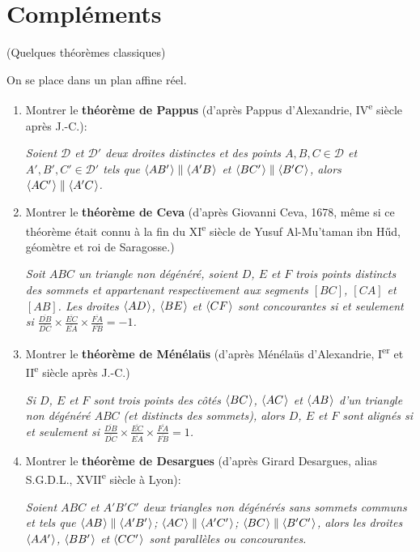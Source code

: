 \documentclass[a4paper,12pt,reqno]{amsart}
\begin{document}
\section{Compléments}

\begin{exo} (Quelques théorèmes classiques)

  On se place dans un plan affine réel.

  \begin{enumerate}
  \item Montrer le \textbf{théorème de Pappus} (d'après Pappus d'Alexandrie, IV\textsuperscript{e} siècle après J.-C.):

  \textit{\og Soient $\mathcal{D}$ et $\mathcal{D}'$ deux droites distinctes et des points $A,B,C\in \mathcal{D}$ et $A',B',C'\in \mathcal{D}'$
  tels que $\langle{AB'}\kern.07em\rangle\parallel\langle{A'B}\kern.07em\rangle$ et $\langle{BC'}\kern.07em\rangle\parallel\langle{B'C}\kern.07em\rangle$, alors $\langle{AC'}\kern.07em\rangle\parallel\langle{A'C}\kern.07em\rangle$.\fg}

  \item Montrer le \textbf{théorème de Ceva} (d'après Giovanni Ceva, 1678, même si ce théorème était connu à la fin du XI\textsuperscript{e} siècle de Yusuf Al-Mu'taman ibn Hűd, géomètre et roi de Saragosse.)

  \textit{\og Soit $ABC$ un triangle non dégénéré, soient $D$, $E$ et $F$ trois points distincts des sommets et appartenant respectivement aux segments $[BC]$, $[CA]$ et $[AB]$. Les droites $\langle{AD}\kern.07em\rangle$, $\langle{BE}\kern.07em\rangle$ et $\langle{CF}\kern.07em\rangle$ sont concourantes si et seulement si $\frac{\overline{DB}}{\overline{DC}}\times\frac{\overline{EC}}{\overline{EA}}\times\frac{\overline{FA}}{\overline{FB}}=-1$.\fg}

  \item Montrer le \textbf{théorème de Ménélaüs} (d'après Ménélaüs d'Alexandrie, I\textsuperscript{er} et II\textsuperscript{e} siècle après J.-C.)

  \textit{\og Si $D$, $E$ et $F$ sont trois points des côtés $\langle{BC}\kern.07em\rangle$, $\langle{AC}\kern.07em\rangle$ et $\langle{AB}\kern.07em\rangle$ d'un triangle non dégénéré $ABC$ (et distincts des sommets), alors $D$, $E$ et $F$ sont alignés si et seulement si $\frac{\overline{DB}}{\overline{DC}}\times\frac{\overline{EC}}{\overline{EA}}\times\frac{\overline{FA}}{\overline{FB}}=1$.\fg}

  \item Montrer le \textbf{théorème de Desargues} (d'après Girard Desargues, alias S.G.D.L., XVII\textsuperscript{e} siècle à Lyon):

  \textit{\og Soient $ABC$ et $A'B'C'$ deux triangles non dégénérés sans sommets communs et tels que $\langle{AB}\kern.07em\rangle\parallel\langle{A'B'}\kern.07em\rangle$; $\langle{AC}\kern.07em\rangle\parallel\langle{A'C'}\kern.07em\rangle$; $\langle{BC}\kern.07em\rangle\parallel\langle{B'C'}\kern.07em\rangle$, alors les droites $\langle{AA'}\kern.07em\rangle$, $\langle{BB'}\kern.07em\rangle$ et $\langle{CC'}\kern.07em\rangle$ sont parallèles ou concourantes.\fg}

  \end{enumerate}
\end{exo}
\end{document}
